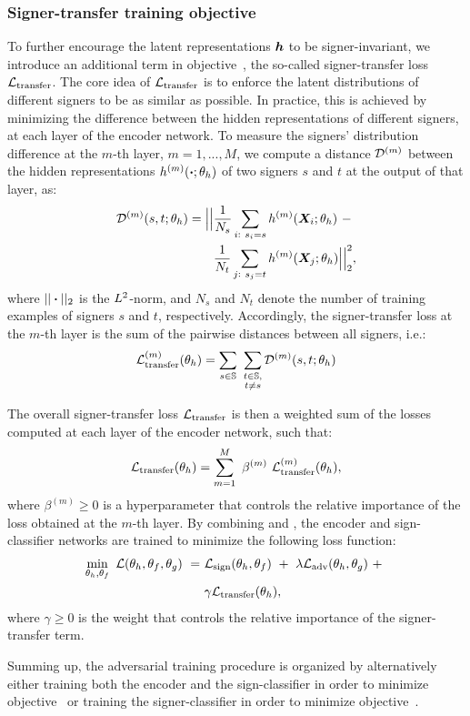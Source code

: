 \subsubsection{Signer-transfer training objective}
To further encourage the latent representations ${\bm{h}}$ to be signer-invariant, we introduce an additional term in objective~, the so-called signer-transfer loss ${\mathcal{L}}_{\text{transfer}}$. The core idea of ${\mathcal{L}}_{\text{transfer}}$ is to enforce the latent distributions of different signers to be as similar as possible. In practice, this is achieved by minimizing the difference between the hidden representations of different signers, at each layer of the encoder network. To measure the signers' distribution difference at the $m$-th layer, $m=1,...,M$, we compute a distance ${\mathcal{D}}^{(m)}$ between the hidden representations $h^{(m)}(\boldsymbol{\cdot};\theta_h)$ of two signers $s$ and $t$ at the output of that layer, as:
\begin{align}
\label{eq:sign_transfer_pairwise_loss}
{\mathcal{D}}^{(m)}(s, t; \theta_h) = \Big|\Big|& \frac{1}{N_s} \sum_{\substack{i:~s_i = s}} h^{(m)}({\bm{X}}_{i}; \theta_h)~-~\nonumber\\ &\frac{1}{N_t}\sum_{\substack{j:~s_j = t}} h^{(m)}({\bm{X}}_{j}; \theta_h) \Big|\Big|_2^2,
\end{align}
where $||\boldsymbol{\cdot}||_2$ is the $L^2$-norm, and $N_s$ and $N_t$ denote the number of training examples of signers $s$ and $t$, respectively. Accordingly, the signer-transfer loss at the $m$-th layer is the sum of the pairwise distances between all signers, i.e.:
\begin{equation}
{\mathcal{L}}_{\text{transfer}}^{(m)}(\theta_h) = \sum_{s \in {\mathbb{S}}}~\sum_{\substack{t \in {\mathbb{S}}, \\ t \neq s}} {\mathcal{D}}^{(m)}(s,t; \theta_h)
\end{equation}

The overall signer-transfer loss ${\mathcal{L}}_{\text{transfer}}$ is then a weighted sum of the losses computed at each layer of the encoder network, such that:
\begin{equation}
\label{eq:signer_transfer_loss}
{\mathcal{L}}_{\text{transfer}}(\theta_h) = \sum_{m=1}^{M}~\beta^{(m)}~{\mathcal{L}}_{\text{transfer}}^{(m)}(\theta_h),
\end{equation}
where $\beta^{(m)}\geq 0$ is a hyperparameter that controls the relative importance of the loss obtained at the $m$-th layer.
By combining  and , the encoder and sign-classifier networks are trained to minimize the following loss function:
\begin{align}
\label{eq:enc_sign_loss}
\min_{\theta_h, \theta_f}~{\mathcal{L}}(\theta_h, \theta_f, \theta_g)~=~& {\mathcal{L}}_{\text{sign}}(\theta_h, \theta_f)~+~\lambda {\mathcal{L}}_{\text{adv}}(\theta_h, \theta_g)~+~\nonumber\\
&\gamma {\mathcal{L}}_{\text{transfer}}(\theta_h),
\end{align}
where $\gamma \geq 0$ is the weight that controls the relative importance of the signer-transfer term.

Summing up, the adversarial training procedure is organized by alternatively either training both the encoder and the sign-classifier in order to minimize objective~ or training the signer-classifier in order to minimize objective~.
